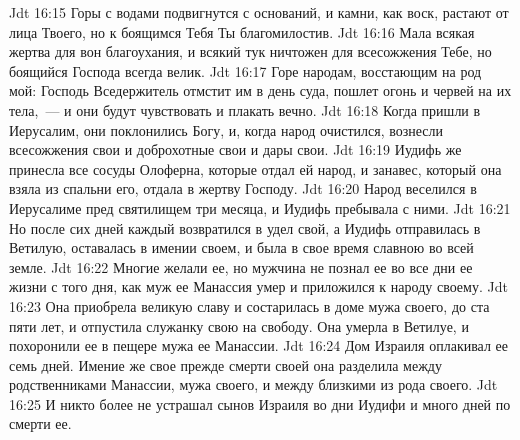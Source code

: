 \vs Jdt 16:15 Горы с водами подвигнутся с оснований, и камни, как воск, растают от лица Твоего, но к боящимся Тебя Ты благомилостив.
\vs Jdt 16:16 Мала всякая жертва для вон благоухания, и всякий тук ничтожен для всесожжения Тебе, но боящийся Господа всегда велик.
\vs Jdt 16:17 Горе народам, восстающим на род мой: Господь Вседержитель отмстит им в день суда, пошлет огонь и червей на их тела,~--- и они будут чувствовать  и плакать вечно.
\rsbpar\vs Jdt 16:18 Когда пришли в Иерусалим, они поклонились Богу, и, когда народ очистился, вознесли всесожжения свои и доброхотные  свои и дары свои.
\vs Jdt 16:19 Иудифь же принесла все сосуды Олоферна, которые отдал ей народ, и занавес, который она взяла из спальни его, отдала в жертву Господу.
\vs Jdt 16:20 Народ веселился в Иерусалиме пред святилищем три месяца, и Иудифь пребывала с ними.
\vs Jdt 16:21 Но после сих дней каждый возвратился в удел свой, а Иудифь отправилась в Ветилую,  оставалась в имении своем, и была в свое время славною во всей земле.
\vs Jdt 16:22 Многие желали ее, но мужчина не познал ее во все дни ее жизни с того дня, как муж ее Манассия умер и приложился к народу своему.
\vs Jdt 16:23 Она приобрела великую славу и состарилась в доме мужа своего,  до ста пяти лет, и отпустила служанку свою на свободу. Она умерла в Ветилуе, и похоронили ее в пещере мужа ее Манассии.
\vs Jdt 16:24 Дом Израиля оплакивал ее семь дней. Имение же свое прежде смерти своей она разделила между родственниками Манассии, мужа своего, и между близкими из рода своего.
\vs Jdt 16:25 И никто более не устрашал сынов Израиля во дни Иудифи и много дней по смерти ее.
